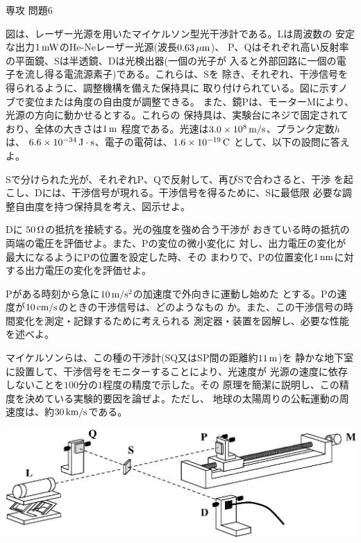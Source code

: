 \documentclass[fleqn]{jbook}
\begin{document}
\begin{question}{専攻 問題6}{}

図は、レーザー光源を用いたマイケルソン型光干渉計である。Lは周波数の
安定な出力$1\,{\rm mW}$のHe-Neレーザー光源(波長$0.63\,{\rm \mu m}$)、
P、Qはそれぞれ高い反射率の平面鏡、Sは半透鏡、Dは光検出器(一個の光子が
入ると外部回路に一個の電子を流し得る電流源素子)である。これらは、Sを
除き、それぞれ、干渉信号を得られるように、調整機構を備えた保持具に
取り付けられている。図に示すノブで変位または角度の自由度が調整できる。
また、鏡Pは、モーターMにより、光源の方向に動かせるとする。これらの
保持具は、実験台にネジで固定されており、全体の大きさは$1\,{\rm m}$
程度である。光速は$3.0\times 10^{8}\,{\rm m/s}$、プランク定数$h$は、
$6.6\times 10^{-34}\,{\rm J\cdot s}$、電子の電荷は、$1.6\times 10^{-19}\,{\rm C}$
として、以下の設問に答えよ。


\begin{subquestions}
\SubQuestion
  Sで分けられた光が、それぞれP、Qで反射して、再びSで合わさると、干渉
  を起こし、Dには、干渉信号が現れる。干渉信号を得るために、Sに最低限
  必要な調整自由度を持つ保持具を考え、図示せよ。

\SubQuestion
  Dに $50\,{\rm \Omega}$の抵抗を接続する。光の強度を強め合う干渉が
  おきている時の抵抗の両端の電圧を評価せよ。また、Pの変位の微小変化に
  対し、出力電圧の変化が最大になるようにPの位置を設定した時、その
  まわりで、Pの位置変化$1\,{\rm nm}$に対する出力電圧の変化を評価せよ。

\SubQuestion
  Pがある時刻から急に$10\,{\rm m/s^2}$の加速度で外向きに運動し始めた
  とする。Pの速度が$10\,{\rm cm/s}$のときの干渉信号は、どのようなもの
  か。また、この干渉信号の時間変化を測定・記録するために考えられる
  測定器・装置を図解し、必要な性能を述べよ。

\SubQuestion
  マイケルソンらは、この種の干渉計(SQ又はSP間の距離約$11\,{\rm m}$)を
  静かな地下室に設置して、干渉信号をモニターすることにより、光速度が
  光源の速度に依存しないことを$100$分の$1$程度の精度で示した。その
  原理を簡潔に説明し、この精度を決めている実験的要因を論ぜよ。ただし、
  地球の太陽周りの公転運動の周速度は、約$30\,{\rm km/s}$である。

\end{subquestions}
\begin{center}
  \mbox{\includegraphics[clip]{1993phy6-1.eps}}
\end{center}

\end{question}
\end{document}
